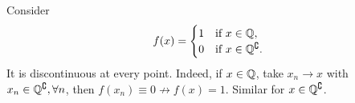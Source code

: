 \begin{example}
    Consider 
    \[
        f(x) = \begin{cases}
        1 &\text{if }x\in \mathbb{Q}, \\
        0 &\text{if }x\in {\mathbb{Q}}^\complement.\\
        \end{cases} 
    \]
    It is discontinuous at every point. Indeed, if $x\in {\mathbb{Q}}$, take $x_n\to x$ with $ x_n\in {\mathbb{Q}}^\complement,\forall n $, then $ f(x_n)\equiv 0 \nrightarrow f(x)=1 $. Similar for $ x\in {\mathbb{Q}}^\complement $.
\end{example}